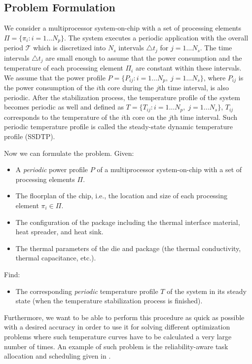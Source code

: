 \subsection{Problem Formulation}
We consider a multiprocessor system-on-chip with a set of processing elements $\Pi = \{ \pi_i: i = 1 \dots N_p \}$. The system executes a periodic application with the overall period $\mathcal{T}$ which is discretized into $N_s$ intervals $\triangle t_j$ for $j = 1 \dots N_s$. The time intervals $\triangle t_j$ are small enough to assume that the power consumption and the temperature of each processing element $\Pi_i$ are constant within these intervals. We assume that the power profile $P = \{ P_{ij}: i = 1 \dots N_p, \; j = 1 \dots N_s \}$, where $P_{ij}$ is the power consumption of the $i$th core during the $j$th time interval, is also periodic. After the stabilization process, the temperature profile of the system becomes periodic as well and defined as $T = \{ T_{ij}: i = 1 \dots N_p, \; j = 1 \dots N_s \}$, ${T_{ij}}$ corresponds to the temperature of the ${i}$th core on the $j$th time interval. Such periodic temperature profile is called the steady-state dynamic temperature profile (SSDTP).

Now we can formulate the problem. Given:
\begin{itemize}
  \item A \emph{periodic} power profile $P$ of a multiprocessor system-on-chip with a set of processing elements $\Pi$.
  \item The floorplan of the chip, i.e., the location and size of each processing element $\pi_i \in \Pi$.
  \item The configuration of the package including the thermal interface material, heat spreader, and heat sink.
  \item The thermal parameters of the die and package (the thermal conductivity, thermal capacitance, etc.).
\end{itemize}
Find:
\begin{itemize}
  \item The corresponding \emph{periodic} temperature profile $T$ of the system in its steady state (when the temperature stabilization process is finished).
\end{itemize}

Furthermore, we want to be able to perform this procedure as quick as possible with a desired accuracy in order to use it for solving different optimization problems where such temperature curves have to be calculated a very large number of times. An example of such problem is the reliability-aware task allocation and scheduling given in .


